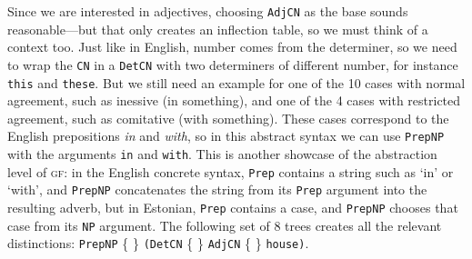 \documentclass[11pt]{article}
\def\t#1{\texttt{#1}}
\def\gf{\textsc{gf}}
\begin{document}

\noindent Since we are interested in adjectives, choosing \t{AdjCN} as
the base sounds reasonable---but that only creates an inflection
table, so we must think of a context too. Just like in English, number
comes from the determiner, so we need to wrap the \t{CN} in a \t{DetCN}
with two determiners of different number, for instance \t{this} and
\t{these}. But we still need an example for one of the 10 cases with
normal agreement, such as inessive (in something), and one of the 4
cases with restricted agreement, such as comitative (with something).
These cases correspond to the English prepositions \emph{in} and \emph{with},
so in this abstract syntax we can use \t{PrepNP} with the arguments
\t{in} and \t{with}. This is another showcase of the abstraction level
of \gf{}: in the English concrete syntax, \t{Prep} contains a string
such as `in' or `with', and \t{PrepNP} concatenates the string from its
\t{Prep} argument into the resulting adverb, but in Estonian, \t{Prep}
contains a case, and \t{PrepNP} chooses that case from its \t{NP} argument.
The following set of 8 trees creates all the relevant
distinctions:
 \t{PrepNP} \{  \}
             {\tt (DetCN} \{  \} 
             {\tt AdjCN}  \{ \} 
             {\tt house)}.

\end{document}
